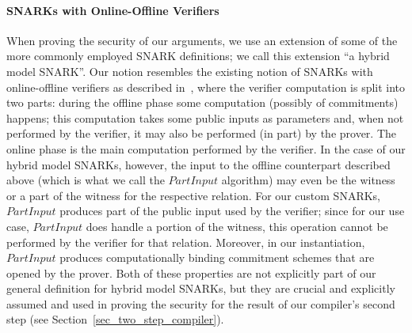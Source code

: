 \paragraph{SNARKs with Online-Offline Verifiers} When proving the security of our arguments, we use an extension of some of the more commonly 
employed SNARK definitions; we call this extension ``a hybrid model SNARK''. Our notion resembles the existing notion of SNARKs with online-offline 
verifiers as described in~\cite{HP_paper}, where the verifier computation is split into two parts: during the offline phase some computation (possibly of 
commitments) happens; this computation takes some public inputs as parameters and, when not performed by the verifier, it may also be performed 
(in part) by the prover. The online phase is the main computation performed by the verifier. In the case of our hybrid model SNARKs, however, the 
input to the offline counterpart described above (which is what we call the $\mathit{PartInput}$ algorithm) may even be the witness or a part of the 
witness for the respective relation. For our custom SNARKs, $\mathit{PartInput}$ produces part of the public input used by the verifier; since for our 
use case, $\mathit{PartInput}$ does handle a portion of the witness, this operation cannot be performed by the verifier for that relation. Moreover, 
in our instantiation, $\mathit{PartInput}$ produces computationally binding commitment schemes that are opened by the prover. Both of these 
properties are not explicitly part of our general definition for hybrid model SNARKs, but they are crucial and explicitly assumed and used in proving 
the security for the result of our compiler's second step (see Section~\ref{sec_two_step_compiler}).


%



